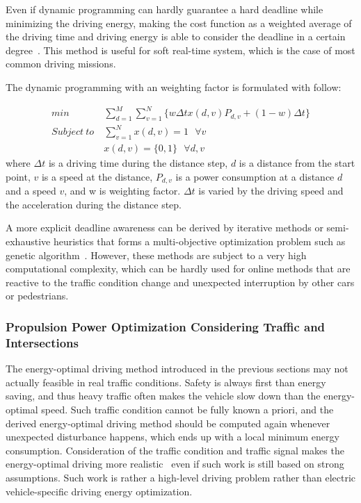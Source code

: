 Even if dynamic programming can hardly guarantee a hard deadline while minimizing the driving energy, making the cost function as a weighted average of the driving time and driving energy is able to consider the deadline in a certain degree~\cite{Dib:IVPPC11,Dib:OGST12,Mensing:TR13,Lin:CCA14}. This method is useful for soft real-time system, which is the case of most common driving missions.

The dynamic programming with an weighting factor is formulated with follow:

\begin{align} \label{eq:dynamic_programming}
min ~& \sum_{d=1}^{M}\sum_{v=1}^{N}\{w \Delta t x(d,v)P_{d,v} + (1-w)\Delta t \}\\
Subject~to ~& \sum_{v=1}^{N}x(d,v) = 1~~~\forall v \nonumber \\
~&x(d,v) = \{0, 1\} ~~~\forall d, v \nonumber
\end{align}
%
where $\Delta t$ is a driving time during the distance step, $d$ is a distance from the start point, $v$ is a speed at the distance, $P_{d,v}$ is a power consumption at a distance $d$ and a speed $v$, and w is weighting factor. $\Delta t$ is varied by the driving speed and the acceleration during the distance step.

A more explicit deadline awareness can be derived by iterative methods or semi-exhaustive heuristics that forms a multi-objective optimization problem such as genetic algorithm~\cite{Kachroudi:TVT12,Dovgana:ASC14}. However, these methods are subject to a very high computational complexity, which can be hardly used for online methods that are reactive to the traffic condition change and unexpected interruption by other cars or pedestrians.

\subsubsection{Propulsion Power Optimization Considering Traffic and Intersections} \label{subsubsec:opt_traffic}

The energy-optimal driving method introduced in the previous sections may not actually feasible in real traffic conditions. Safety is always first than energy saving, and thus heavy traffic often makes the vehicle slow down than the energy-optimal speed. Such traffic condition cannot be fully known a priori, and the derived energy-optimal driving method should be computed again whenever unexpected disturbance happens, which ends up with a local minimum energy consumption. Consideration of the traffic condition and traffic signal makes the energy-optimal driving more realistic~\cite{Mensing:TR13,Lim:TVT17,Mandava:ITSC09,Asadi:TCST11,Ozatay:CDC13,Nunzio:JRNC15,Wu:ITS15}  even if such work is still based on strong assumptions. Such work is rather a high-level driving problem rather than electric vehicle-specific driving energy optimization.

